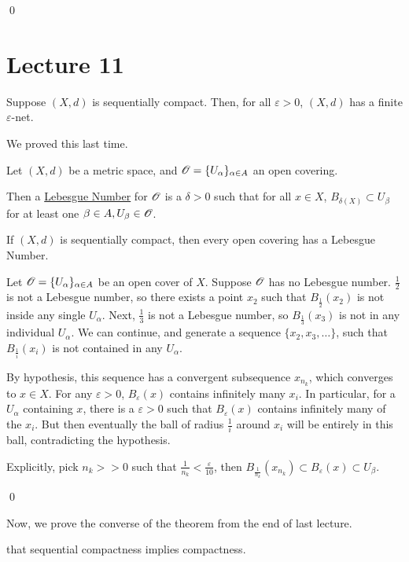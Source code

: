 \documentclass[x11names,reqno,14pt]{extarticle}
\begin{document}
\qed

\section*{Lecture 11}

\lem

Suppose $(X, d)$ is sequentially compact. Then, for all $\varepsilon>0$, $(X, d)$ has a finite $\varepsilon$-net. 

We proved this last time. 


Let $(X, d)$ be a metric space, and $\mathscr{O} = \{U_\alpha\}_{\alpha\in A}$ an open covering. 

Then a \underline{Lebesgue Number} for $\mathscr{O}$ is a $\delta>0$ such that for all $x \in X$, $B_{\delta(X)}\subset U_\beta$ for at least one $\beta \in A, U_\beta \in \mathscr{O}$. 

\lem

If $(X, d)$ is sequentially compact, then every open covering has a Lebesgue Number.

\proof

Let $\mathscr{O} = \{U_\alpha\}_{\alpha\in A}$ be an open cover of $X$.  Suppose $\mathscr{O}$ has no Lebesgue number. $\frac{1}{2}$ is not a Lebesgue number, so there exists a point $x_2$ such that $B_{\frac{1}{2}}(x_2)$ is not inside any single $U_\alpha$. Next, $\frac{1}{3}$ is not a Lebesgue number, so $B_{\frac{1}{3}}(x_3)$ is not in any individual $U_\alpha$. We can continue, and generate a sequence $\{x_2, x_3, \dots\}$, such that $B_{\frac{1}{i}}(x_i)$ is not contained in any $U_\alpha$. 

By hypothesis, this sequence has a convergent subsequence $x_{n_k}$, which converges to $x \in X$. For any $\varepsilon>0$, $B_{\varepsilon}(x)$ contains infinitely many $x_i$. In particular, for a $U_\alpha$ containing $x$, there is a $\varepsilon>0$ such that $B_{\varepsilon}(x)$ contains infinitely many of the $x_i$. But then eventually the ball of radius $\frac{1}{i}$ around $x_i$ will be entirely in this ball, contradicting the hypothesis. 

Explicitly, pick $n_k >>0$ such that $\frac{1}{n_k} < \frac{\varepsilon}{10}$, then $B_{\frac{1}{n_k}}(x_{n_k}) \subset B_\varepsilon(x) \subset U_\beta$. 

\qed

Now, we prove the converse of the theorem from the end of last lecture. 

\proof that sequential compactness implies compactness. 
\end{document}

